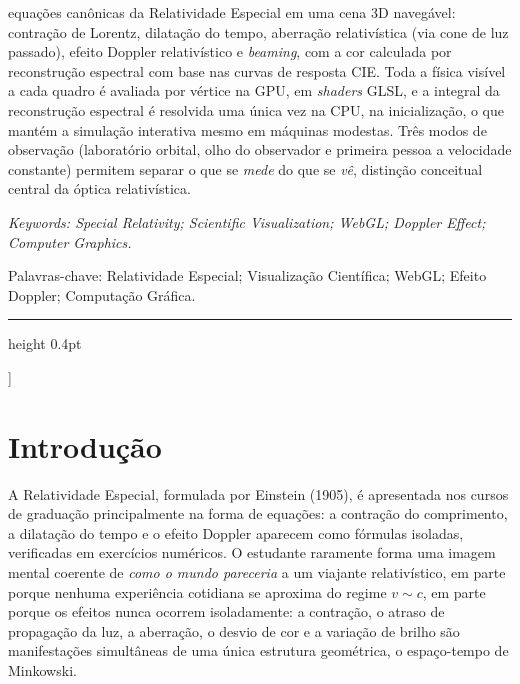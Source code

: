 \documentclass[10pt,a4paper,twocolumn]{article}
\begin{document}
{{  equações canônicas da Relatividade Especial em uma cena 3D navegável: contração de
  Lorentz, dilatação do tempo, aberração relativística (via cone de luz passado), efeito
  Doppler relativístico e \emph{beaming}, com a cor calculada por reconstrução espectral
  com base nas curvas de resposta CIE. Toda a física visível a cada quadro é avaliada por
  vértice na GPU, em \emph{shaders} GLSL, e a integral da reconstrução espectral é resolvida
  uma única vez na CPU, na inicialização, o que mantém a simulação interativa mesmo em
  máquinas modestas. Três
  modos de observação (laboratório orbital, olho do observador e primeira pessoa a
  velocidade constante) permitem separar o que se \emph{mede} do que se \emph{vê}, distinção
  conceitual central da óptica relativística.\par
  }
  \vspace{0.8em}
  {\small\itshape
  \noindent Keywords: Special Relativity; Scientific Visualization; WebGL; Doppler Effect;
  Computer Graphics.\par
  \vspace{0.25em}
  \noindent Palavras-chave: Relatividade Especial; Visualização Científica; WebGL; Efeito
  Doppler; Computação Gráfica.\par
  }
  \vspace{0.7em}
  \hrule height 0.4pt
  \vspace{1.8em}
}]

{\let\thefootnote\relax{}}

\section{Introdução}

A Relatividade Especial, formulada por Einstein (1905), é apresentada nos cursos de
graduação principalmente na forma de equações: a contração do comprimento, a dilatação do
tempo e o efeito Doppler aparecem como fórmulas isoladas, verificadas em exercícios
numéricos. O estudante raramente forma uma imagem mental coerente de \emph{como o mundo
pareceria} a um viajante relativístico, em parte porque nenhuma experiência cotidiana se
aproxima do regime $v \sim c$, em parte porque os efeitos nunca ocorrem isoladamente: a
contração, o atraso de propagação da luz, a aberração, o desvio de cor e a variação de
brilho são manifestações simultâneas de uma única estrutura geométrica, o espaço-tempo de
Minkowski.
\end{document}
